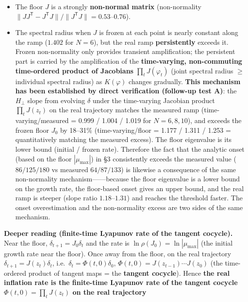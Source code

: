 \documentclass[
  a4paper,
]{ltjsarticle}
\providecommand{\tightlist}{%
  \setlength{\itemsep}{0pt}\setlength{\parskip}{0pt}}
\begin{document}
\begin{itemize}
\tightlist
\item
  The floor \(J\) is a strongly \textbf{non-normal matrix}
  (non-normality
  \(\|JJ^{\mathsf T}-J^{\mathsf T}J\|/\|J^{\mathsf T}J\|=0.53\)--\(0.76\)).
\item
  The spectral radius when \(J\) is frozen at each point is nearly
  constant along the ramp (\(1.402\) for \(N=6\)), but the real ramp
  \textbf{persistently} exceeds it. Frozen non-normality only provides
  transient amplification; the persistent part is carried by the
  amplification of the \textbf{time-varying, non-commuting time-ordered
  product of Jacobians} \(\prod_t J(\varphi_t)\) (joint spectral radius
  \(\ge\) individual spectral radius) as \(K(\varphi)\) changes
  gradually. \textbf{This mechanism has been established by direct
  verification (follow-up test A)}: the \(H_\perp\) slope from evolving
  \(\delta\) under the time-varying Jacobian product \(\prod_t J(z_t)\)
  on the real trajectory matches the measured ramp
  (time-varying/measured = 0.999 / 1.004 / 1.019 for \(N=6,8,10\)), and
  exceeds the frozen floor \(J_0\) by 18--31\% (time-varying/floor =
  1.177 / 1.311 / 1.253 = quantitatively matching the measured excess).
  The floor eigenvalue is its lower bound (initial / frozen rate).
  Therefore the fact that the analytic onset (based on the floor
  \(|\mu_{\max}|\)) in §3 consistently exceeds the measured value
  (\(86/125/180\) vs measured \(64/87/133\)) is likewise a consequence
  of the same non-normality mechanism------because the floor eigenvalue
  is a lower bound on the growth rate, the floor-based onset gives an
  upper bound, and the real ramp is steeper (slope ratio
  \(1.18\)--\(1.31\)) and reaches the threshold faster. The onset
  overestimation and the non-normality excess are two sides of the same
  mechanism.
\end{itemize}

\textbf{Deeper reading (finite-time Lyapunov rate of the tangent
cocycle).} Near the floor, \(\delta_{t+1}=J_0\delta_t\) and the rate is
\(\ln\rho(J_0)=\ln|\mu_{\max}|\) (the initial growth rate near the
floor). Once away from the floor, on the real trajectory
\(\delta_{t+1}=J(z_t)\delta_t\), i.e.~\(\delta_t=\Phi(t,0)\delta_0\),
\(\Phi(t,0)=J(z_{t-1})\cdots J(z_0)\) (the time-ordered product of
tangent maps = the \textbf{tangent cocycle}). Hence \textbf{the real
inflation rate is the finite-time Lyapunov rate of the tangent cocycle
\(\Phi(t,0)=\prod_t J(z_t)\) on the real trajectory}
\end{document}
